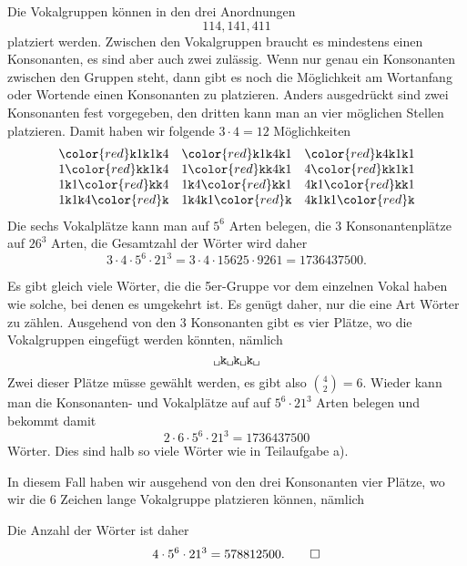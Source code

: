 \begin{loesung}
\begin{teilaufgaben}
\item
Die Vokalgruppen können in den drei Anordnungen
\[
114, 141, 411
\]
platziert werden.
Zwischen den Vokalgruppen braucht es mindestens einen Konsonanten,
es sind aber auch zwei zulässig.
Wenn nur genau ein Konsonanten zwischen den Gruppen steht, dann gibt
es noch die Möglichkeit am Wortanfang oder Wortende einen Konsonanten zu
platzieren.
Anders ausgedrückt sind zwei Konsonanten fest vorgegeben, den dritten
kann man an vier möglichen Stellen platzieren.
Damit haben wir folgende $3\cdot 4=12$ Möglichkeiten
\[
\def\k{\texttt{k}}
\def\K{\bgroup\color{red}\texttt{k}\egroup}
\begin{matrix}
\K1\k1\k4&\K1\k4\k1&\K4\k1\k1\\
1\K\k1\k4&1\K\k4\k1&4\K\k1\k1\\
1\k1\K\k4&1\k4\K\k1&4\k1\K\k1\\
1\k1\k4\K&1\k4\k1\K&4\k1\k1\K
\end{matrix}
\]
Die sechs Vokalplätze kann man auf $5^6$ Arten belegen,
die 3 Konsonantenplätze auf $26^3$ Arten,
die Gesamtzahl der Wörter wird daher
\[
3\cdot 4 \cdot 5^6 \cdot 21^3
=
3\cdot 4 \cdot 15625 \cdot 9261
=
1736437500.
\]
\item
Es gibt gleich viele Wörter, die die 5er-Gruppe vor dem einzelnen
Vokal haben wie solche, bei denen es umgekehrt ist.
Es genügt daher, nur die eine Art Wörter zu zählen.
Ausgehend von den 3 Konsonanten gibt es vier Plätze, wo die Vokalgruppen
eingefügt werden könnten, nämlich
\[
\texttt{\textvisiblespace k\textvisiblespace k\textvisiblespace k\textvisiblespace}
\]
Zwei dieser Plätze müsse gewählt werden,
es gibt also 
$ \binom{4}{2} =6 $.
Wieder kann man die Konsonanten- und Vokalplätze auf auf
$5^6\cdot 21^3$ Arten belegen und bekommt damit
\[
2\cdot 6 \cdot5^6\cdot 21^3
=
1736437500
\]
Wörter.
Dies sind halb so viele Wörter wie in Teilaufgabe a).
\item
In diesem Fall haben wir ausgehend von den drei Konsonanten
vier Plätze, wo wir die 6 Zeichen lange Vokalgruppe platzieren können,
nämlich
\begin{center}
\end{center}
Die Anzahl der Wörter ist daher
\[
4\cdot 5^6\cdot 21^3
=
578812500.
\qedhere
\]
\end{teilaufgaben}
\end{loesung}


